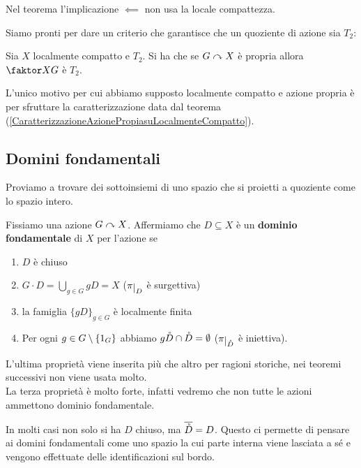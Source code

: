 \begin{multicols*}{2}
\begin{remark}
Nel teorema l'implicazione $\impliedby$ non usa la locale compattezza.
\end{remark}

\noindent Siamo pronti per dare un criterio che garantisce che un quoziente di azione sia $T_2$:
\begin{theorem}\label{CriterioSufficientePerQuozientePerAzioneT2}
Sia $X$ localmente compatto e $T_2$. Si ha che se $G\curvearrowright X$ \`e propria allora $\quot XG$ \`e $T_2$.
\end{theorem}

\begin{remark}
L'unico motivo per cui abbiamo supposto localmente compatto e azione propria \`e per sfruttare la caratterizzazione data dal teorema (\ref{CaratterizzazioneAzionePropiasuLocalmenteCompatto}).
\end{remark}

\subsection{Domini fondamentali}
Proviamo a trovare dei sottoinsiemi di uno spazio che si proietti a quoziente come lo spazio intero.

\begin{definition}
Fissiamo una azione $G\curvearrowright X$. Affermiamo che $D\subseteq X$ \`e un \textbf{dominio fondamentale} di $X$ per l'azione se
\begin{enumerate}[noitemsep]
\item $D$ \`e chiuso
\item $G\cdot D=\bigcup_{g\in G}gD=X$ ($\pi\res D$ \`e surgettiva)
\item la famiglia $\{gD\}_{g\in G}$ \`e localmente finita
\item Per ogni $g\in G\setminus\{1_G\}$ abbiamo $g{\mathring {D}}\cap {\mathring {D}}=\emptyset$ ($\pi\res{\rg D}$ \`e iniettiva).
\end{enumerate}
\end{definition}
\begin{remark}
L'ultima propriet\`a viene inserita pi\`u che altro per ragioni storiche, nei teoremi successivi non viene usata molto.\\
La terza propriet\`a \`e molto forte, infatti vedremo che non tutte le azioni ammettono dominio fondamentale.
\end{remark}
\begin{remark}
In molti casi non solo si ha $D$ chiuso, ma $\overline{{\mathring {D}}}=D$. Questo ci permette di pensare ai domini fondamentali come uno spazio la cui parte interna viene lasciata a s\'e e vengono effettuate delle identificazioni sul bordo.
\end{remark}


\end{multicols*}
